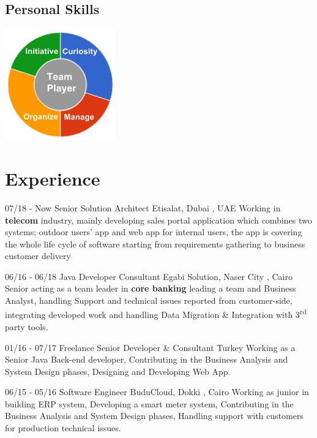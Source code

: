 \documentclass[]{friggeri-cv}
\begin{document}
\begin{aside}
  \section{Personal Skills}
    \includegraphics[scale=0.62]{img/personal.png}
\end{aside}


\section{Experience}
\begin{entrylist}
\entry
    {07/18 - Now}
    {Senior Solution Architect}
    {Etisalat, Dubai , UAE}
    {Working in \textbf{telecom} industry, mainly developing sales portal application which combines two systems; outdoor users' app and web app for internal users, the app is covering the whole life cycle of software starting from requirements gathering to business customer delivery\\}
    
  \entry
    {06/16 - 06/18}
    {Java Developer Consultant}
    {Egabi Solution, Naser City , Cairo}
    {Senior acting as a team leader in \textbf{core banking} leading a team and Business Analyst, handling Support and technical issues reported from customer-side, integrating developed work and handling Data Migration \& Integration with 3\textsuperscript{rd} party tools.\\}
    
  \entry
    {01/16 - 07/17}
    {Freelance Senior Developer \& Consultant}
    {Turkey}
    {Working as a Senior Java Back-end developer, Contributing in the Business Analysis and System Design phases, Designing and Developing Web App.\\}
    
    \entry
    {06/15 - 05/16}
    {Software Engineer}
    {BuduCloud, Dokki , Cairo}
    {Working as junior in building ERP system, Developing a smart meter system, Contributing in the Business Analysis and System Design phases, Handling support with customers for production technical issues.\\}
\end{entrylist}
\end{document}
